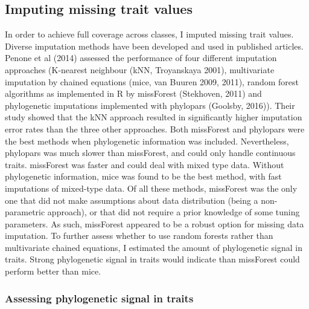 \subsection{Imputing missing trait values}
In order to achieve full coverage across classes, I imputed missing trait values. Diverse imputation methods have been developed and used in published articles. Penone et al (2014) assessed the performance of four different imputation approaches (K-nearest neighbour (kNN, Troyanskaya 2001), multivariate imputation by chained equations (mice, van Buuren 2009, 2011), random forest algorithms as implemented in R by missForest (Stekhoven, 2011) and phylogenetic imputations implemented with phylopars (Goolsby, 2016)). Their study showed that the kNN approach resulted in significantly higher imputation error rates than the three other approaches. Both missForest and phylopars were the best methods when phylogenetic information was included. Nevertheless, phylopars was much slower than missForest, and could only handle continuous traits. missForest was faster and could deal with mixed type data. Without phylogenetic information, mice was found to be the best method, with fast imputations of mixed-type data. Of all these methods, missForest was the only one that did not make assumptions about data distribution (being a non-parametric approach), or that did not require a prior knowledge of some tuning parameters. As such, missForest appeared to be a robust option for missing data imputation. To further assess whether to use random forests rather than multivariate chained equations, I estimated the amount of phylogenetic signal in traits. Strong phylogenetic signal in traits would indicate than missForest could perform better than mice.

\subsubsection{Assessing phylogenetic signal in traits}

